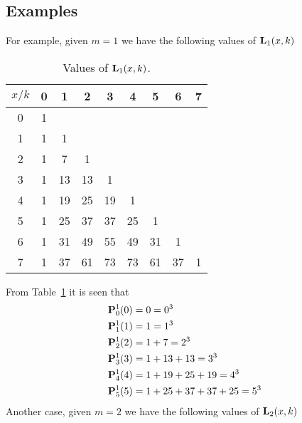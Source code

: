 \subsection{Examples} \label{subsec:examples}
For example, given $m=1$ we have the following values of ${\mathbf{L}}\sb{1}(x,k)$
\begin{table}[H]
    \begin{tabular}{c|cccccccc}
        $x/k$ & 0 & 1  & 2  & 3  & 4  & 5  & 6  & 7 \\[3px]
        \hline
        0     & 1 &    &    &    &    &    &    &   \\
        1     & 1 & 1  &    &    &    &    &    &   \\
        2     & 1 & 7  & 1  &    &    &    &    &   \\
        3     & 1 & 13 & 13 & 1  &    &    &    &   \\
        4     & 1 & 19 & 25 & 19 & 1  &    &    &   \\
        5     & 1 & 25 & 37 & 37 & 25 & 1  &    &   \\
        6     & 1 & 31 & 49 & 55 & 49 & 31 & 1  &   \\
        7     & 1 & 37 & 61 & 73 & 73 & 61 & 37 & 1
    \end{tabular}
    \caption{Values of ${\mathbf{L}}\sb{1}(x,k)$.}
    \label{tab:tab_3}
\end{table}
From Table~\ref{tab:tab_3} it is seen that
\begin{equation*}
    \begin{split}
        {\mathbf{P}}\sp{1} \sb{0}(0) &= 0 = 0^3 \\
        {\mathbf{P}}\sp{1} \sb{1}(1) &= 1 = 1^3 \\
        {\mathbf{P}}\sp{1} \sb{2}(2) &= 1+7 = 2^3 \\
        {\mathbf{P}}\sp{1} \sb{3}(3) &= 1+13+13 = 3^3 \\
        {\mathbf{P}}\sp{1} \sb{4}(4) &= 1+19+25+19 = 4^3 \\
        {\mathbf{P}}\sp{1} \sb{5}(5) &= 1+25+37+37+25 = 5^3
    \end{split}
\end{equation*}
Another case, given $m=2$ we have the following values of ${\mathbf{L}}\sb{2}(x,k)$

